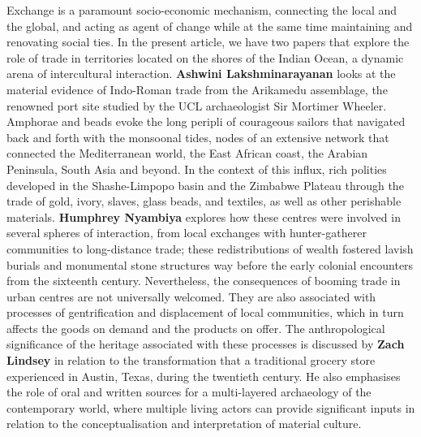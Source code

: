 Exchange is a paramount socio-economic mechanism, connecting the local and the global, and acting as agent of change while at the same time maintaining and renovating social ties. In the present article, we have two papers that explore the role of trade in territories located on the shores of the Indian Ocean, a dynamic arena of intercultural interaction. \textbf{Ashwini Lakshminarayanan} looks at the material evidence of Indo-Roman trade from the Arikamedu assemblage, the renowned port site studied by the UCL archaeologist Sir Mortimer Wheeler. Amphorae and beads evoke the long peripli of courageous sailors that navigated back and forth with the monsoonal tides, nodes of an extensive network that connected the Mediterranean world, the East African coast, the Arabian Peninsula, South Asia and beyond. In the context of this influx, rich polities developed in the Shashe-Limpopo basin and the Zimbabwe Plateau through the trade of gold, ivory, slaves, glass beads, and textiles, as well as other perishable materials.
\textbf{Humphrey Nyambiya} explores how these centres were involved in several spheres of interaction, from local exchanges with hunter-gatherer communities to long-distance trade; these redistributions of wealth fostered lavish burials and monumental stone structures way before the early colonial encounters from the sixteenth century. Nevertheless, the consequences of booming trade in urban centres are not universally welcomed. They are also associated with processes of gentrification and displacement of local communities, which in turn affects the goods on demand and the products on offer.
The anthropological significance of the heritage associated with these processes is discussed by \textbf{Zach Lindsey} in relation to the transformation that a traditional grocery store experienced in Austin, Texas, during the twentieth century. He also emphasises the role of oral and written sources for a multi-layered archaeology of the contemporary world, where multiple living actors can provide significant inputs in relation to the conceptualisation and interpretation of material culture.


